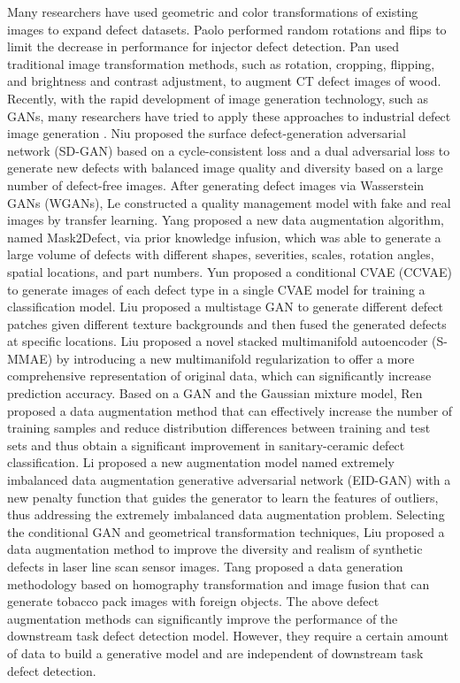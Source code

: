 \documentclass[sn-mathphys]{sn-jnl}%
\theoremstyle{thmstyleone}%
\theoremstyle{thmstyletwo}%
\theoremstyle{thmstylethree}%
\begin{document}
Many researchers have used geometric and color transformations of existing images to expand defect datasets. 
Paolo \cite{sassi2019smart} performed random rotations and flips to limit the decrease in performance for injector defect detection. 
Pan \cite{pan2021artificial} used traditional image transformation methods, such as rotation, cropping, flipping, and brightness and contrast adjustment, to augment CT defect images of wood.
Recently, with the rapid development of image generation technology, such as GANs, many researchers have tried to apply these approaches to industrial defect image generation \cite{jain2020synthetic,xuan2018multiview}.
Niu \cite{niu2020defect} proposed the surface defect-generation adversarial network (SD-GAN) based on a cycle-consistent loss and a dual adversarial loss to generate new defects with balanced image quality and diversity based on a large number of defect-free images. 
After generating defect images via Wasserstein GANs (WGANs), Le \cite{le2020learning} constructed a quality management model with fake and real images by transfer learning. 
Yang \cite{yang2021mask2defect} proposed a new data augmentation algorithm, named Mask2Defect, via prior knowledge infusion, which was able to generate a large volume of defects with different shapes, severities, scales, rotation angles, spatial locations, and part numbers. 
Yun \cite{yun2020automated} proposed a conditional CVAE (CCVAE) to generate images of each defect type in a single CVAE model for training a classification model. 
Liu \cite{liu2019multistage} proposed a multistage GAN to generate different defect patches given different texture backgrounds and then fused the generated defects at specific locations. 
Liu \cite{liu2021learning} proposed a novel stacked multimanifold autoencoder (S-MMAE) by introducing a new multimanifold regularization to offer a more comprehensive representation of original data, which can significantly increase prediction accuracy.
Based on a GAN and the Gaussian mixture model, Ren \cite{ren2022data} proposed a data augmentation method that can effectively increase the number of training samples and reduce distribution differences between training and test sets and thus obtain a significant improvement in sanitary-ceramic defect classification.
Li \cite{li2022eid} proposed a new augmentation model named extremely imbalanced data augmentation generative adversarial network (EID-GAN) with a new penalty function that guides the generator to learn the features of outliers, thus addressing the extremely imbalanced data augmentation problem.
Selecting the conditional GAN and geometrical transformation techniques, Liu \cite{liu2021defect} proposed a data augmentation method to improve the diversity and realism of synthetic defects in laser line scan sensor images.
Tang \cite{tang2022cascaded} proposed a data generation methodology based on homography transformation and image fusion that can generate tobacco pack images with foreign objects.
The above defect augmentation methods can significantly improve the performance of the downstream task defect detection model. However, they require a certain amount of data to build a generative model and are independent of downstream task defect detection.
\end{document}

